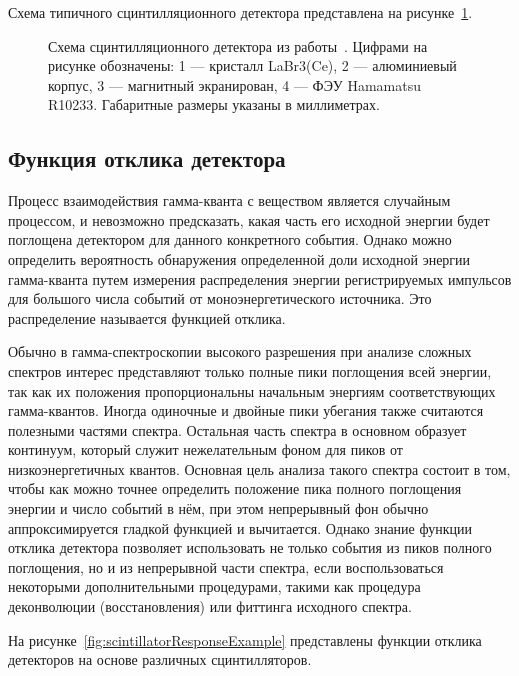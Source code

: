 Схема типичного сцинтилляционного детектора представлена на рисунке~\ref{fig:scintillatorSchemeExample}.

\begin{figure}[ht]
  \caption{ Схема сцинтилляционного детектора из работы~\cite{Grozdanov2021}. Цифрами на рисунке обозначены: 1 --- кристалл LaBr3(Ce), 2 --- алюминиевый корпус, 3 --- магнитный экранирован, 4 --- ФЭУ Hamamatsu R10233. Габаритные размеры указаны в миллиметрах.}
  \label{fig:scintillatorSchemeExample}
\end{figure}



\subsection{Функция отклика детектора}

Процесс взаимодействия гамма-кванта с веществом является случайным процессом, и невозможно предсказать, какая часть его исходной энергии будет поглощена детектором для данного конкретного  события. Однако можно определить вероятность обнаружения определенной доли исходной энергии гамма-кванта путем измерения распределения энергии регистрируемых импульсов для большого числа событий от моноэнергетического источника. Это распределение называется функцией отклика.~\cite{Grozdanov2021} 

Обычно в гамма-спектроскопии высокого разрешения при анализе сложных спектров интерес представляют только полные пики поглощения всей энергии, так как их положения пропорциональны начальным энергиям соответствующих гамма-квантов. Иногда одиночные и двойные пики убегания также считаются полезными частями спектра. Остальная часть спектра в основном образует континуум, который служит нежелательным фоном для пиков от низкоэнергетичных квантов. Основная цель анализа такого спектра состоит в том, чтобы как можно точнее определить положение пика полного поглощения энергии и число событий в нём, при этом непрерывный фон обычно аппроксимируется гладкой функцией и вычитается. Однако знание функции отклика детектора позволяет использовать не только события из пиков полного поглощения, но и из непрерывной части спектра, если воспользоваться некоторыми дополнительными процедурами, такими как процедура деконволюции (восстановления) или фиттинга исходного спектра.~\cite{Grozdanov2021}

На рисунке~\ref{fig:scintillatorResponseExample} представлены функции отклика детекторов на основе различных сцинтилляторов. 

